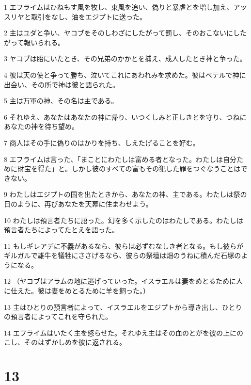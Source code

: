 \par 1 エフライムはひねもす風を牧し、東風を追い、偽りと暴虐とを増し加え、アッスリヤと取引をなし、油をエジプトに送った。
\par 2 主はユダと争い、ヤコブをそのしわざにしたがって罰し、そのおこないにしたがって報いられる。
\par 3 ヤコブは胎にいたとき、その兄弟のかかとを捕え、成人したとき神と争った。
\par 4 彼は天の使と争って勝ち、泣いてこれにあわれみを求めた。彼はベテルで神に出会い、その所で神は彼と語られた。
\par 5 主は万軍の神、その名は主である。
\par 6 それゆえ、あなたはあなたの神に帰り、いつくしみと正しきとを守り、つねにあなたの神を待ち望め。
\par 7 商人はその手に偽りのはかりを持ち、しえたげることを好む。
\par 8 エフライムは言った、「まことにわたしは富める者となった。わたしは自分ために財宝を得た」と。しかし彼のすべての富もその犯した罪をつぐなうことはできない。
\par 9 わたしはエジプトの国を出たときから、あなたの神、主である。わたしは祭の日のように、再びあなたを天幕に住まわせよう。
\par 10 わたしは預言者たちに語った。幻を多く示したのはわたしである。わたしは預言者たちによってたとえを語った。
\par 11 もしギレアデに不義があるなら、彼らは必ずむなしき者となる。もし彼らがギルガルで雄牛を犠牲にささげるなら、彼らの祭壇は畑のうねに積んだ石塚のようになる。
\par 12 （ヤコブはアラムの地に逃げっていった。イスラエルは妻をめとるために人に仕えた。彼は妻をめとるために羊を飼った。）
\par 13 主はひとりの預言者によって、イスラエルをエジプトから導き出し、ひとりの預言者によってこれを守られた。
\par 14 エフライムはいたく主を怒らせた。それゆえ主はその血のとがを彼の上にのこし、そのはずかしめを彼に返される。

\chapter{13}

